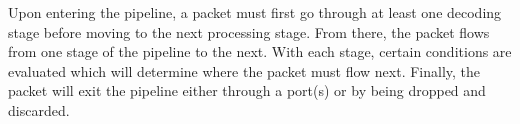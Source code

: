 Upon entering the pipeline, a packet must first go through at least one decoding stage before moving to the next processing stage. From there, the packet flows from one stage of the pipeline to the next. With each stage, certain conditions are evaluated which will determine where the packet must flow next. Finally, the packet will exit the pipeline either through a port(s) or by being dropped and discarded.
